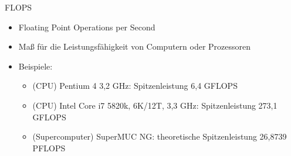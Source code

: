 \documentclass[
  german,            %
  aspectratio=169,    %
]{tumbeamer}
\begin{document}
\begin{frame}[c, fragile]{FLOPS}{}
	\begin{itemize}
		\item Floating Point Operations per Second
		\item Maß für die Leistungsfähigkeit von Computern oder Prozessoren
		\item Beispiele:
		\begin{itemize}
			\item (CPU) Pentium 4 3,2 GHz: Spitzenleistung 6,4 GFLOPS
			\item (CPU) Intel Core i7 5820k, 6K/12T, 3,3 GHz: Spitzenleistung 273,1 GFLOPS
			\item (Supercomputer) SuperMUC NG: theoretische Spitzenleistung 26,8739 PFLOPS
		\end{itemize}
	\end{itemize}
\end{frame}
\end{document}
